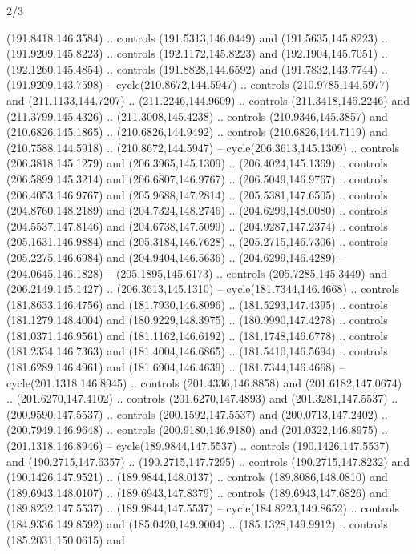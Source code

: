 \begin{flagdescription}{2/3}
\begin{scope}[xshift=0.5\flaglength,yshift=0.5\flagwidth,scale=\flagwidth/180]
\begin{scope}[y=0.8pt, x=0.8pt, yscale=-1,shift={(-168.75,-108.75)}]
  (191.8418,146.3584) .. controls (191.5313,146.0449) and (191.5635,145.8223) ..
  (191.9209,145.8223) .. controls (192.1172,145.8223) and (192.1904,145.7051) ..
  (192.1260,145.4854) .. controls (191.8828,144.6592) and (191.7832,143.7744) ..
  (191.9209,143.7598) -- cycle(210.8672,144.5947) .. controls
  (210.9785,144.5977) and (211.1133,144.7207) .. (211.2246,144.9609) .. controls
  (211.3418,145.2246) and (211.3799,145.4326) .. (211.3008,145.4238) .. controls
  (210.9346,145.3857) and (210.6826,145.1865) .. (210.6826,144.9492) .. controls
  (210.6826,144.7119) and (210.7588,144.5918) .. (210.8672,144.5947) --
  cycle(206.3613,145.1309) .. controls (206.3818,145.1279) and
  (206.3965,145.1309) .. (206.4024,145.1369) .. controls (206.5899,145.3214) and
  (206.6807,146.9767) .. (206.5049,146.9767) .. controls (206.4053,146.9767) and
  (205.9688,147.2814) .. (205.5381,147.6505) .. controls (204.8760,148.2189) and
  (204.7324,148.2746) .. (204.6299,148.0080) .. controls (204.5537,147.8146) and
  (204.6738,147.5099) .. (204.9287,147.2374) .. controls (205.1631,146.9884) and
  (205.3184,146.7628) .. (205.2715,146.7306) .. controls (205.2275,146.6984) and
  (204.9404,146.5636) .. (204.6299,146.4289) -- (204.0645,146.1828) --
  (205.1895,145.6173) .. controls (205.7285,145.3449) and (206.2149,145.1427) ..
  (206.3613,145.1310) -- cycle(181.7344,146.4668) .. controls
  (181.8633,146.4756) and (181.7930,146.8096) .. (181.5293,147.4395) .. controls
  (181.1279,148.4004) and (180.9229,148.3975) .. (180.9990,147.4278) .. controls
  (181.0371,146.9561) and (181.1162,146.6192) .. (181.1748,146.6778) .. controls
  (181.2334,146.7363) and (181.4004,146.6865) .. (181.5410,146.5694) .. controls
  (181.6289,146.4961) and (181.6904,146.4639) .. (181.7344,146.4668) --
  cycle(201.1318,146.8945) .. controls (201.4336,146.8858) and
  (201.6182,147.0674) .. (201.6270,147.4102) .. controls (201.6270,147.4893) and
  (201.3281,147.5537) .. (200.9590,147.5537) .. controls (200.1592,147.5537) and
  (200.0713,147.2402) .. (200.7949,146.9648) .. controls (200.9180,146.9180) and
  (201.0322,146.8975) .. (201.1318,146.8946) -- cycle(189.9844,147.5537) ..
  controls (190.1426,147.5537) and (190.2715,147.6357) .. (190.2715,147.7295) ..
  controls (190.2715,147.8232) and (190.1426,147.9521) .. (189.9844,148.0137) ..
  controls (189.8086,148.0810) and (189.6943,148.0107) .. (189.6943,147.8379) ..
  controls (189.6943,147.6826) and (189.8232,147.5537) .. (189.9844,147.5537) --
  cycle(184.8223,149.8652) .. controls (184.9336,149.8592) and
  (185.0420,149.9004) .. (185.1328,149.9912) .. controls (185.2031,150.0615) and

\end{scope}
\end{scope}
\end{flagdescription}
